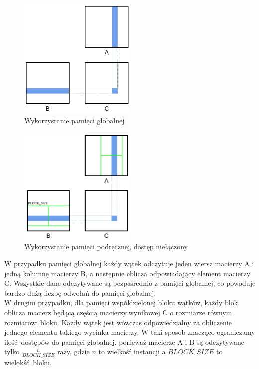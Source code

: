 \documentclass[10pt,a4paper]{article}
\begin{document}
\begin{figure}[h]
	\centering
	\includegraphics[width=0.5\textwidth]{1.png}
	\caption{Wykorzystanie pamięci globalnej}
\end{figure}

\begin{figure}[h]
	\centering
	\includegraphics[width=0.5\textwidth]{2.png}
	\caption{Wykorzystanie pamięci podręcznej, dostęp niełączony}
\end{figure}

W przypadku pamięci globalnej każdy wątek odczytuje jeden wiersz macierzy A i jedną
kolumnę macierzy B, a następnie oblicza odpowiadający element macierzy C. Wszystkie
dane odczytywane są bezpośrednio z pamięci globalnej, co powoduje bardzo dużą liczbę odwołań
do pamięci globalnej.\\
W drugim przypadku, dla pamięci współdzielonej bloku wątków, każdy blok oblicza macierz
będącą częścią macierzy wynikowej C o rozmiarze równym rozmiarowi bloku. Każdy wątek
jest wówczas odpowiedzialny za obliczenie jednego elementu takiego wycinka macierzy.
W taki sposób znacząco ograniczamy ilość dostępów do pamięci globalnej, ponieważ macierze
A i B są odczytywane tylko $\frac{n}{BLOCK\_SIZE}$ razy, gdzie $n$ to wielkość instancji a
$BLOCK\_SIZE$ to wielokść bloku.
\end{document}
